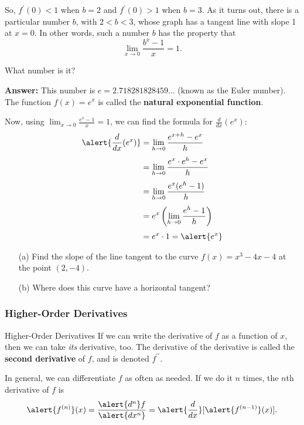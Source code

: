 \documentclass[cal1spr16Lectures.tex]{subfiles}
\begin{document}
\begin{frame}\footnotesize
So, $f^{\prime}(0)<1$ when $b=2$ and $f^{\prime}(0)>1$ when $b=3$.  As it turns out, there is a particular number $b$, with $2<b<3$, whose graph has a tangent line with slope 1 at $x=0$.  In other words, such a number $b$ has the property that 
\[\lim_{x \to 0} \frac{b^x-1}{x}=1.\]
\begin{que}What number is it? \end{que}
{\bf Answer:} This number is $e=2.718281828459 \dots$ (known as the Euler number).  The function $f(x)=e^x$ is called the \alert{\bf natural exponential function}.
\end{frame}

\begin{frame}\footnotesize
Now, using  $\displaystyle\lim_{x \to 0} \frac{e^x-1}{x}=1$, we can find the formula for $\frac{d}{dx}(e^x)$:
\begin{align*}
\alert{\frac{d}{dx}(e^x)} &= \lim_{h \to 0} \frac{e^{x+h}-e^x}{h} \\[0.25pc]
 &= \lim_{h \to 0}\frac{e^x \cdot e^h -e^x}{h} \\[0.25pc]
 &= \lim_{h\to 0}\frac{e^x(e^h-1)}{h} \\[0.25pc]
 &=e^x \left(\lim_{h \to 0} \frac{e^h-1}{h}\right) \\[0.25pc]
  &= e^x \cdot 1 = \alert{e^x}
\end{align*}
\end{frame}

\begin{frame}{}
\begin{exe} 
	\begin{itemize}
	\item[(a)] Find the slope of the line tangent to the curve $f(x)=x^3-4x-4$ at the point $(2,-4)$. 
	\item[(b)] Where does this curve have a horizontal tangent?
	\end{itemize}
\end{exe}	
\end{frame}

\subsubsection{Higher-Order Derivatives}

\begin{frame}{\small Higher-Order Derivatives}
If we can write the derivative of $f$ as a function of $x$, then we can take \emph{its} derivative, too.  The derivative of the derivative is called the {\bf second derivative} of $f$, and is denoted $f^{\prime\prime}$.  

\vspace{1pc}
In general, we can differentiate $f$ as often as needed.  If we do it $n$ times, the $n$th derivative of $f$ is 
\[\alert{f^{(n)}}(x)=\frac{\alert{d^n} f}{\alert{dx^n}}=\alert{\frac{d}{dx}}[\alert{f^{(n-1)}}(x)].\]
\end{frame}
\end{document}
